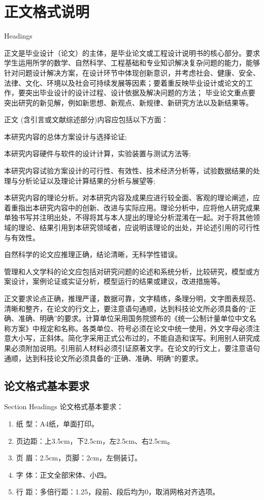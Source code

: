\chapter{正文格式说明}{Headings}

正文是毕业设计（论文）的主体，是毕业论文或工程设计说明书的核心部分。要求学生运用所学的数学、自然科学、工程基础和专业知识解决复杂问题的能力，能够针对问题设计解决方案，在设计环节中体现创新意识，并考虑社会、健康、安全、法律、文化、环境以及社会可持续发展等因素；要着重反映毕业设计或论文的工作，要突出毕业设计的设计过程、设计依据及解决问题的方法； 毕业论文重点要突出研究的新见解，例如新思想、新观点、新规律、新研究方法以及新结果等。

正文 (含引言或文献综述部分)内容应包括以下方面：

本研究内容的总体方案设计与选择论证;

本研究内容硬件与软件的设计计算，实验装置与测试方法等;

本研究内容试验方案设计的可行性、有效性、技术经济分析等，试验数据结果的处理与分析论证以及理论计算结果的分析与展望等;

本研究内容的理论分析。对本研究内容及成果应进行较全面、客观的理论阐述，应着重指出本研究内容中的创新、改进与实际应用。理论分析中，应将他人研究成果单独书写并注明出处，不得将其与本人提出的理论分析混淆在一起。对于将其他领域的理论、结果引用到本研究领域者，应说明该理论的出处，并论述引用的可行性与有效性。

自然科学的论文应推理正确，结论清晰，无科学性错误。

管理和人文学科的论文应包括对研究问题的论述和系统分析，比较研究，模型或方案设计，案例论证或实证分析，模型运行的结果或建议，改进措施等。

正文要求论点正确，推理严谨，数据可靠，文字精练，条理分明，文字图表规范、清晰和整齐，在论文的行文上，要注意语句通顺，达到科技论文所必须具备的“正确、准确、明确”的要求。计算单位采用国务院颁布的《统一公制计量单位中文名称方案》中规定和名称。各类单位、符号必须在论文中统一使用，外文字母必须注意大小写，正斜体。简化字采用正式公布过的，不能自造和误写。利用别人研究成果必须附加说明。引用前人材料必须引证原著文字。在论文的行文上，要注意语句通顺，达到科技论文所必须具备的“正确、准确、明确”的要求。
\newpage

\section{论文格式基本要求}{Section Headings}
\label{sec:section}
论文格式基本要求：

\begin{enumerate}[(1)]
	\item 纸  型：A4纸，单面打印。
	\item 页边距：上3.5cm，下2.5cm，左2.5cm、右2.5cm。
	\item 页  眉：2.5cm，页脚：2cm，左侧装订。
	\item 字  体：正文全部宋体、小四。
	\item 行  距：多倍行距：1.25，段前、段后均为0，取消网格对齐选项。
\end{enumerate}


